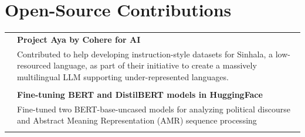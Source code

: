 \section{Open-Source Contributions}
\begin{tabular}{r|p{17.5cm}}
    \emph{} & \normalsize \bf Project Aya by Cohere for AI \textsc{}  \\\textsc{}&\small{Contributed to help developing instruction-style datasets for Sinhala, a low-resourced language, as part of their initiative to create a massively multilingual LLM supporting under-represented languages.}\\\multicolumn{2}{c}{} \\
     
     \emph{} & \normalsize \bf Fine-tuning BERT and DistilBERT models in HuggingFace\textsc{}  \\\textsc{}&\small{Fine-tuned two BERT-base-uncased models for analyzing political discourse and Abstract Meaning Representation (AMR) sequence processing}\\\multicolumn{2}{c}{} \\
\end{tabular}
